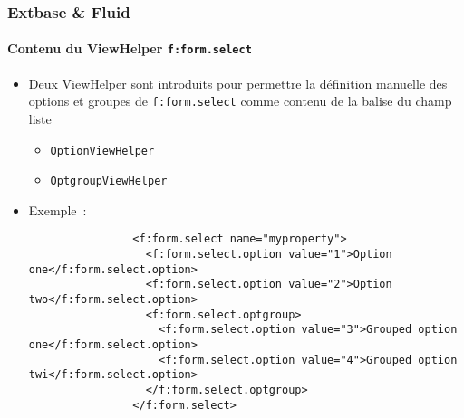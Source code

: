 \begin{frame}[fragile]
	\frametitle{Extbase \& Fluid}
	\framesubtitle{Contenu du ViewHelper \texttt{f:form.select}}

	\lstset{basicstyle=\tiny\ttfamily}

	\begin{itemize}
		\item Deux ViewHelper sont introduits pour permettre la définition manuelle des
			options et groupes de \texttt{f:form.select} comme contenu de la balise du
			champ liste

			\begin{itemize}
				\item \texttt{OptionViewHelper}
				\item \texttt{OptgroupViewHelper}
			\end{itemize}

		\item Exemple~:

			\begin{lstlisting}
				<f:form.select name="myproperty">
				  <f:form.select.option value="1">Option one</f:form.select.option>
				  <f:form.select.option value="2">Option two</f:form.select.option>
				  <f:form.select.optgroup>
				    <f:form.select.option value="3">Grouped option one</f:form.select.option>
				    <f:form.select.option value="4">Grouped option twi</f:form.select.option>
				  </f:form.select.optgroup>
				</f:form.select>
			\end{lstlisting}

		\end{itemize}

\end{frame}


